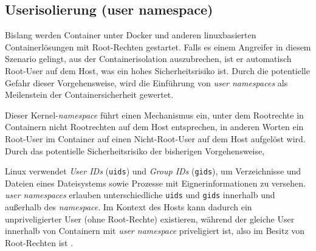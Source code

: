 \documentclass[../main.tex]{subfiles}
\begin{document}


			\cite[S.4]{dockerSec1}


    \subsection{Userisolierung (user namespace)}
			Bislang werden Container unter Docker und anderen linuxbasierten Containerlösungen mit Root-Rechten gestartet. Falls es einem Angreifer in diesem Szenario gelingt, aus der Containerisolation auszubrechen, ist er automatisch Root-User auf dem Host, was ein hohes Sicherheitsrisiko ist. Durch die potentielle Gefahr dieser Vorgehensweise, wird die Einführung von \emph{user namespaces} als Meilenstein der Containersicherheit gewertet.

			Dieser Kernel-\emph{namespace} führt einen Mechanismus ein, unter dem Rootrechte in Containern nicht Rootrechten auf dem Host entsprechen, in anderen Worten ein Root-User im Container auf einen Nicht-Root-User auf dem Host aufgelöst wird. Durch das potentielle Sicherheitsrisiko der bisherigen Vorgehensweise,

			Linux verwendet \emph{User IDs} (\texttt{uids}) und \emph{Group IDs} (\texttt{gids}), um Verzeichnisse und Dateien eines Dateisystems sowie Prozesse mit Eignerinformationen zu versehen. \emph{user namespaces} erlauben unterschiedliche \texttt{uids} und \texttt{gids} innerhalb und außerhalb des \emph{namespace}. Im Kontext des Hosts kann dadurch ein unpriveligierter User (ohne Root-Rechte) existieren, während der gleiche User innerhalb von Containern mit \emph{user namespace} priveligiert ist, also im Besitz von Root-Rechten ist \cite{nsUser}.
\end{document}
